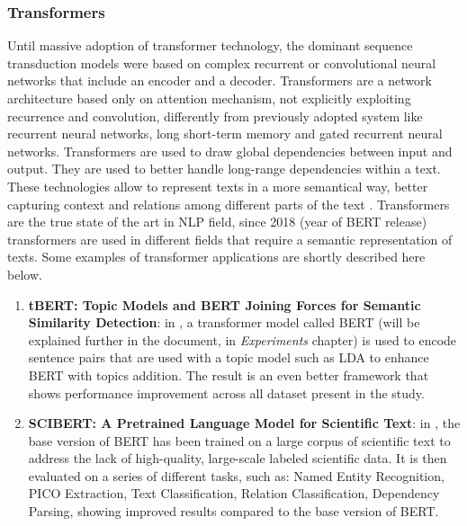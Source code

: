 \documentclass[\main/main.tex]{subfiles}
\begin{document}
\subsubsection{Transformers}
Until massive adoption of transformer technology, the dominant sequence transduction models were based on complex recurrent or convolutional neural networks that include an encoder and a decoder.
Transformers are a network architecture based only on attention mechanism, not explicitly exploiting recurrence and convolution, differently from previously adopted system like recurrent neural networks, long short-term memory and gated recurrent neural networks. Transformers are used to draw global dependencies between input and output. They are used to better handle long-range dependencies within a text. These technologies allow to represent texts in a more semantical way, better capturing context and relations among different parts of the text \cite{vaswani2017attention}. Transformers are the true state of the art in NLP field, since 2018 (year of BERT \cite{devlin2018bert}\cite{bert_blog_post} release) transformers are used in different fields that require a semantic representation of texts. Some examples of transformer applications are shortly described here below.
\begin{enumerate}
    \item \textbf{tBERT: Topic Models and BERT Joining Forces for Semantic Similarity Detection}: in \cite{Peinelt2020tBERTTM}, a transformer model called BERT (will be explained further in the document, in \emph{Experiments} chapter) is used to encode sentence pairs that are used with a topic model such as LDA to enhance BERT with topics addition. The result is an even better framework that shows performance improvement across all dataset present in the study.
    \item \textbf{SCIBERT: A Pretrained Language Model for Scientific Text}: in \cite{Beltagy2019SciBERTAP}, the base version of BERT has been trained on a large corpus of scientific text to address the lack of high-quality, large-scale labeled scientific data. It is then evaluated on a series of different tasks, such as: Named Entity Recognition, PICO Extraction, Text Classification, Relation Classification, Dependency Parsing, showing improved results compared to the base version of BERT.
\end{enumerate}
\end{document}
